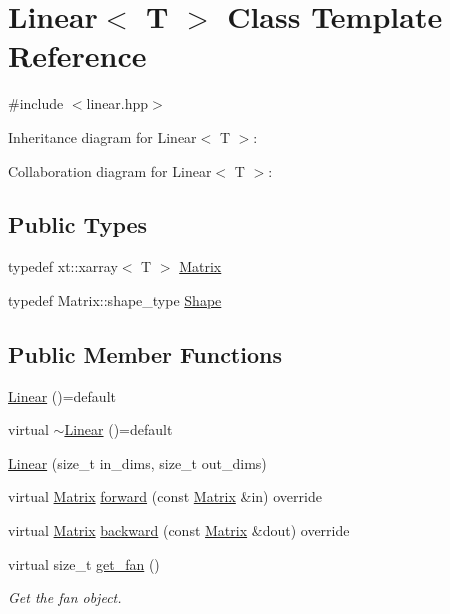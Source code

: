 \hypertarget{class_linear}{}\section{Linear$<$ T $>$ Class Template Reference}
\label{class_linear}


{\ttfamily \#include $<$linear.\+hpp$>$}



Inheritance diagram for Linear$<$ T $>$\+:


Collaboration diagram for Linear$<$ T $>$\+:
\subsection*{Public Types}
\begin{DoxyCompactItemize}
\item 
typedef xt\+::xarray$<$ T $>$ \mbox{\hyperlink{class_linear_a8e402d70272bdb6406745f7ec4139f16}{Matrix}}
\item 
typedef Matrix\+::shape\+\_\+type \mbox{\hyperlink{class_linear_afeccdcd7a158d0fe034436e4eafae066}{Shape}}
\end{DoxyCompactItemize}
\subsection*{Public Member Functions}
\begin{DoxyCompactItemize}
\item 
\mbox{\hyperlink{class_linear_a905089a6472d97cc8b1d201fdd3deef9}{Linear}} ()=default
\item 
virtual \mbox{\hyperlink{class_linear_a42109067fe1d9da36148f7c4f330b564}{$\sim$\+Linear}} ()=default
\item 
\mbox{\hyperlink{class_linear_a335a168705982b1dbf9c16b89465995e}{Linear}} (size\+\_\+t in\+\_\+dims, size\+\_\+t out\+\_\+dims)
\item 
virtual \mbox{\hyperlink{class_layer_a22b1e7286096aa62bd245536c8ebdaf1}{Matrix}} \mbox{\hyperlink{class_linear_a901668e9219a8d446b2ac60718b9c9f1}{forward}} (const \mbox{\hyperlink{class_layer_a22b1e7286096aa62bd245536c8ebdaf1}{Matrix}} \&in) override
\item 
virtual \mbox{\hyperlink{class_layer_a22b1e7286096aa62bd245536c8ebdaf1}{Matrix}} \mbox{\hyperlink{class_linear_a747db1996e723fae7c9713d4b7f303af}{backward}} (const \mbox{\hyperlink{class_layer_a22b1e7286096aa62bd245536c8ebdaf1}{Matrix}} \&dout) override
\item 
virtual size\+\_\+t \mbox{\hyperlink{class_linear_a753a7cb02a0b18e8922d23db905eb534}{get\+\_\+fan}} ()
\begin{DoxyCompactList}\small\item\em Get the fan object. \end{DoxyCompactList}\end{DoxyCompactItemize}
